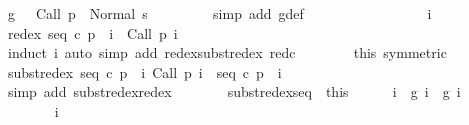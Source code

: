 \begin{isabellebody}
\ {\isachardoublequoteopen}g\ {}\ {\isacharequal}\ {\isacharparenleft}Call\ {\isacharparenleft}p\ {}{\isacharparenright}{\isacharcomma}\ Normal\ {\isacharparenleft}s\ {}{\isacharparenright}{\isacharparenright}{\isachardoublequoteclose}\isanewline
\ \ \ \ \ \ \isamarkupfalse%
\ {\isacharparenleft}simp\ add{\isacharcolon}\ g{\isacharunderscore}def{\isacharparenright}\isanewline
\ \ \ \ \isamarkupfalse%
\isanewline
\ \ \ \ \isacommand{{\isacharbraceleft}}\isamarkupfalse%
\isanewline
\ \ \ \ \ \ \isamarkupfalse%
\ i\isanewline
\ \ \ \ \ \ \isamarkupfalse%
\ {\isachardoublequoteopen}redex\ {\isacharparenleft}seq\ c\ {\isacharparenleft}p\ {}{\isacharparenright}\ i{\isacharparenright}\ {\isacharequal}\ Call\ {\isacharparenleft}p\ i{\isacharparenright}{\isachardoublequoteclose}\isanewline
\ \ \ \ \ \ \ \ \isamarkupfalse%
\ {\isacharparenleft}induct\ i{\isacharparenright}\ {\isacharparenleft}auto\ simp\ add{\isacharcolon}\ redex{\isacharunderscore}subst{\isacharunderscore}redex\ red{\isacharunderscore}c{\isacharparenright}\isanewline
\ \ \ \ \ \ \isamarkupfalse%
\ this\ {\isacharbrackleft}symmetric{\isacharbrackright}\isanewline
\ \ \ \ \ \ \isamarkupfalse%
\ {\isachardoublequoteopen}subst{\isacharunderscore}redex\ {\isacharparenleft}seq\ c\ {\isacharparenleft}p\ {}{\isacharparenright}\ i{\isacharparenright}\ {\isacharparenleft}Call\ {\isacharparenleft}p\ i{\isacharparenright}{\isacharparenright}\ {\isacharequal}\ {\isacharparenleft}seq\ c\ {\isacharparenleft}p\ {}{\isacharparenright}\ i{\isacharparenright}{\isachardoublequoteclose}\isanewline
\ \ \ \ \ \ \ \ \isamarkupfalse%
\ {\isacharparenleft}simp\ add{\isacharcolon}\ subst{\isacharunderscore}redex{\isacharunderscore}redex{\isacharparenright}\isanewline
\ \ \ \ \isacommand{{\isacharbraceright}}\isamarkupfalse%
\ \isamarkupfalse%
\ subst{\isacharunderscore}redex{\isacharunderscore}seq\ {\isacharequal}\ this\isanewline
\ \ \ \ \isamarkupfalse%
\ {\isachardoublequoteopen}{\isasymforall}i{\isachardot}\ {\isasymGamma}{\isasymturnstile}\ {\isacharparenleft}g\ i{\isacharparenright}\ {\isasymrightarrow}\isactrlsup {\isacharplus}\ {\isacharparenleft}g\ {\isacharparenleft}i{\isacharplus}{}{\isacharparenright}{\isacharparenright}{\isachardoublequoteclose}\isanewline
\ \ \ \ \isamarkupfalse%
\ \isanewline
\ \ \ \ \ \ \isamarkupfalse%
\ i\isanewline

\end{isabellebody}
